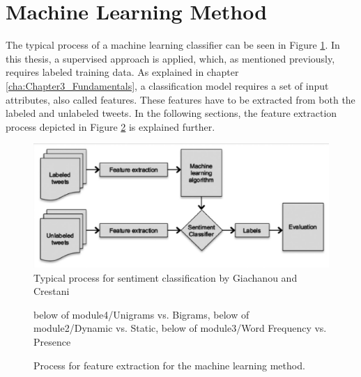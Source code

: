 \section{Machine Learning Method}
The typical process of a machine learning classifier can be seen in Figure \ref{fig:ml_approach}. In this thesis, a supervised approach is applied, which, as mentioned previously, requires labeled training data.
As explained in chapter \ref{cha:Chapter3_Fundamentals}, a classification model requires a set of input attributes, also called features. These features have to be extracted from both the labeled and unlabeled tweets. In the following sections, the feature extraction process depicted in Figure \ref{fig:ml_process} is explained further.
\begin{figure}
    \centering
    \includegraphics[scale=0.5]{Images/ML_approach.png}
    \caption{Typical process for sentiment classification by Giachanou and Crestani \cite[p.~28:3]{DBLP:journals/csur/GiachanouC16}}
    \label{fig:ml_approach}
\end{figure}


\begin{figure}
    \centering

    {below of module4/Unigrams vs. Bigrams, below of module2/Dynamic vs. Static, below of module3/Word Frequency vs. Presence} 


    \vspace{25mm}

   \caption{Process for feature extraction for the machine learning method.}
    \label{fig:ml_process}
\end{figure}

